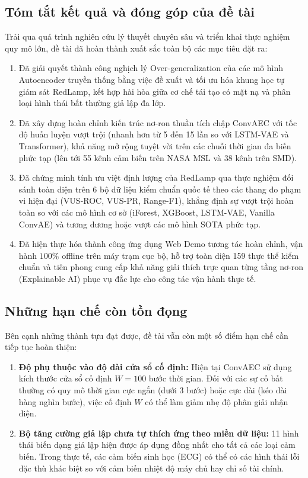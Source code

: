 \documentclass[11pt,journal,onecolumn]{IEEEtran}
\begin{document}
\subsection{Tóm tắt kết quả và đóng góp của đề tài}
Trải qua quá trình nghiên cứu lý thuyết chuyên sâu và triển khai thực nghiệm quy mô lớn, đề tài đã hoàn thành xuất sắc toàn bộ các mục tiêu đặt ra:
\begin{enumerate}
    \item Đã giải quyết thành công nghịch lý Over-generalization của các mô hình Autoencoder truyền thống bằng việc đề xuất và tối ưu hóa khung học tự giám sát RedLamp, kết hợp hài hòa giữa cơ chế tái tạo có mặt nạ và phân loại hình thái bất thường giả lập đa lớp.
    \item Đã xây dựng hoàn chỉnh kiến trúc nơ-ron thuần tích chập ConvAEC với tốc độ huấn luyện vượt trội (nhanh hơn từ 5 đến 15 lần so với LSTM-VAE và Transformer), khả năng mở rộng tuyệt vời trên các chuỗi thời gian đa biến phức tạp (lên tới 55 kênh cảm biến trên NASA MSL và 38 kênh trên SMD).
    \item Đã chứng minh tính ưu việt định lượng của RedLamp qua thực nghiệm đối sánh toàn diện trên 6 bộ dữ liệu kiểm chuẩn quốc tế theo các thang đo phạm vi hiện đại (VUS-ROC, VUS-PR, Range-F1), khẳng định sự vượt trội hoàn toàn so với các mô hình cơ sở (iForest, XGBoost, LSTM-VAE, Vanilla ConvAE) và tương đương hoặc vượt các mô hình SOTA phức tạp.
    \item Đã hiện thực hóa thành công ứng dụng Web Demo tương tác hoàn chỉnh, vận hành $100\%$ offline trên máy trạm cục bộ, hỗ trợ toàn diện 159 thực thể kiểm chuẩn và tiên phong cung cấp khả năng giải thích trực quan từng tầng nơ-ron (Explainable AI) phục vụ đắc lực cho công tác vận hành thực tế.
\end{enumerate}

\subsection{Những hạn chế còn tồn đọng}
Bên cạnh những thành tựu đạt được, đề tài vẫn còn một số điểm hạn chế cần tiếp tục hoàn thiện:
\begin{enumerate}
    \item \textbf{Độ phụ thuộc vào độ dài cửa sổ cố định:} Hiện tại ConvAEC sử dụng kích thước cửa sổ cố định $W = 100$ bước thời gian. Đối với các sự cố bất thường có quy mô thời gian cực ngắn (dưới 3 bước) hoặc cực dài (kéo dài hàng nghìn bước), việc cố định $W$ có thể làm giảm nhẹ độ phân giải nhận diện.
    \item \textbf{Bộ tăng cường giả lập chưa tự thích ứng theo miền dữ liệu:} 11 hình thái biến dạng giả lập hiện được áp dụng đồng nhất cho tất cả các loại cảm biến. Trong thực tế, các cảm biến sinh học (ECG) có thể có các hình thái lỗi đặc thù khác biệt so với cảm biến nhiệt độ máy chủ hay chỉ số tài chính.
\end{enumerate}
\end{document}
